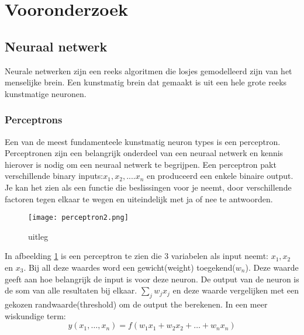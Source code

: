 \section{Vooronderzoek}

\subsection{Neuraal netwerk}
Neurale netwerken zijn een reeks algoritmen die losjes gemodelleerd zijn van het menselijke brein. Een kunstmatig brein dat gemaakt is uit een hele grote reeks kunstmatige neuronen.

\subsubsection{Perceptrons}
Een van de meest fundamenteele kunstmatig neuron types is een perceptron. Perceptronen zijn een belangrijk onderdeel van een neuraal netwerk en kennis hierover is nodig om een neuraal netwerk te begrijpen. Een perceptron pakt verschillende binary inputs:$x_{1}, x_{2},....x_{n}$ en produceerd een enkele binaire output. Je kan het zien als een functie die beslissingen voor je neemt, door verschillende factoren tegen elkaar te wegen en uiteindelijk met ja of nee te antwoorden.
\begin{figure}[h!]
\centering
\texttt{[image: perceptron2.png]}
\caption{uitleg}
\label{peceptron2}
\end{figure}
\linebreak
In afbeelding \ref{peceptron2} is een perceptron te zien die 3 variabelen als input neemt: $x_{1}, x_{2}$ en $x_{3}.$ Bij all deze waardes word een gewicht(weight) toegekend($w_{n}$). Deze waarde geeft aan hoe belangrijk de input is voor deze neuron. De output van de neuron is de som van alle resultaten bij elkaar. $\sum_{j}w_{j}x_{j}$ en deze waarde vergelijken met een gekozen randwaarde(threshold) om de output the berekenen. In een meer wiskundige term:
 \begin{equation}
    y(x_1,\ldots,x_n) = f(w_1x_1 + w_2x_2 + \ldots + w_nx_n)  \label{per-eq}
  \end{equation}

